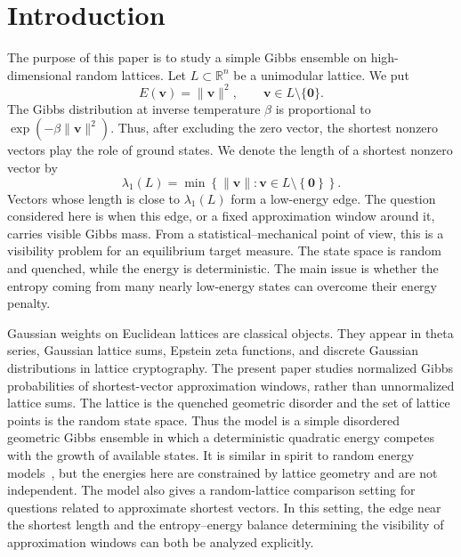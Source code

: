 \documentclass[a4paper,12pt]{article}
\theoremstyle{definition}
\theoremstyle{remark}
\newcommand{\re}{\mathbb R}
\begin{document}
\section{Introduction}
\label{sec:introduction}
%
The purpose of this paper is to study a simple Gibbs ensemble on
high-dimensional random lattices.
Let $L\subset\re^n$ be a unimodular lattice.
We put
$$
E(\bm v)=\|\bm v\|^2,
\qquad \bm v\in L\setminus\{\bm 0\}.
$$
The Gibbs distribution at inverse temperature $\beta$ is proportional to
$\exp(-\beta\|\bm v\|^2)$.
Thus, after excluding the zero vector, the shortest nonzero vectors play the role of ground states.
We denote the length of a shortest nonzero vector by
$$
\lambda_1(L)=
\min\left\{\|\bm v\|:\bm v\in L\setminus\left\{\bm 0\right\}\right\}.
$$
Vectors whose length is close to $\lambda_1(L)$ form a low-energy edge.
The question considered here is when this edge, or a fixed approximation
window around it, carries visible Gibbs mass.
From a statistical--mechanical point of view, this is a visibility problem for
an equilibrium target measure.
The state space is random and quenched, while the energy is deterministic.
The main issue is whether the entropy coming from many nearly low-energy
states can overcome their energy penalty.

Gaussian weights on Euclidean lattices are classical objects.
They appear in theta series, Gaussian lattice sums, Epstein zeta functions,
and discrete Gaussian distributions in lattice cryptography.
The present paper studies normalized Gibbs probabilities of shortest-vector
approximation windows, rather than unnormalized lattice sums.
The lattice is the quenched geometric disorder and the set of lattice points is the random state space.
Thus the model is a simple disordered geometric Gibbs ensemble in which a
deterministic quadratic energy competes with the growth of available states.
It is similar in spirit to random energy models~\cite{Derrida80,Derrida81},
but the energies here are constrained by lattice geometry and are not independent.
The model also gives a random-lattice comparison setting for questions
related to approximate shortest vectors.
In this setting, the edge near the shortest length and the
entropy--energy balance determining the visibility of approximation
windows can both be analyzed explicitly.
\end{document}
